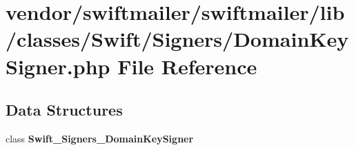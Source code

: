 \section{vendor/swiftmailer/swiftmailer/lib/classes/\+Swift/\+Signers/\+Domain\+Key\+Signer.php File Reference}
\label{_domain_key_signer_8php}
\subsection*{Data Structures}
\begin{DoxyCompactItemize}
\item 
class {\bf Swift\+\_\+\+Signers\+\_\+\+Domain\+Key\+Signer}
\end{DoxyCompactItemize}
